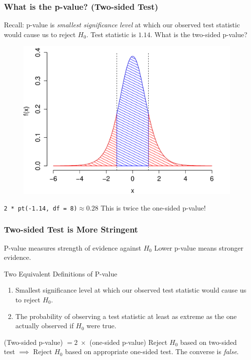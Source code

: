 \documentclass[handout]{beamer}
\begin{document}
\begin{frame}
\frametitle{What is the p-value? (Two-sided Test)}
\footnotesize
Recall: p-value is \emph{smallest significance level} at which our observed test statistic would cause us to reject $H_0$. \alert{Test statistic is $1.14$. What is the two-sided p-value? }
\begin{figure}
\includegraphics[scale= 0.4]{./images/p_both5}
\end{figure}

\texttt{2 * pt(-1.14, df = 8)}$\approx 0.28$ \pause \hfill \alert{This is twice the one-sided p-value!}
\end{frame}


\begin{frame}
\frametitle{Two-sided Test is More Stringent}
\begin{block}{P-value measures strength of evidence against $H_0$}
Lower p-value means stronger evidence. 
\end{block}

\begin{block}{Two Equivalent Definitions of P-value}
	\begin{enumerate}
		\item Smallest significance level at which our observed test statistic would cause us to reject $H_0$.
		\item The probability of observing a test statistic at least as extreme as the one actually observed if $H_0$ were true.
	\end{enumerate}
\end{block}


\begin{block}{(Two-sided p-value) $= 2 \; \times$  (one-sided p-value)}
Reject $H_0$ based on two-sided test $\implies$ Reject $H_0$ based on appropriate one-sided test. The converse is \emph{false}.
\end{block}


\end{frame}
\end{document}
